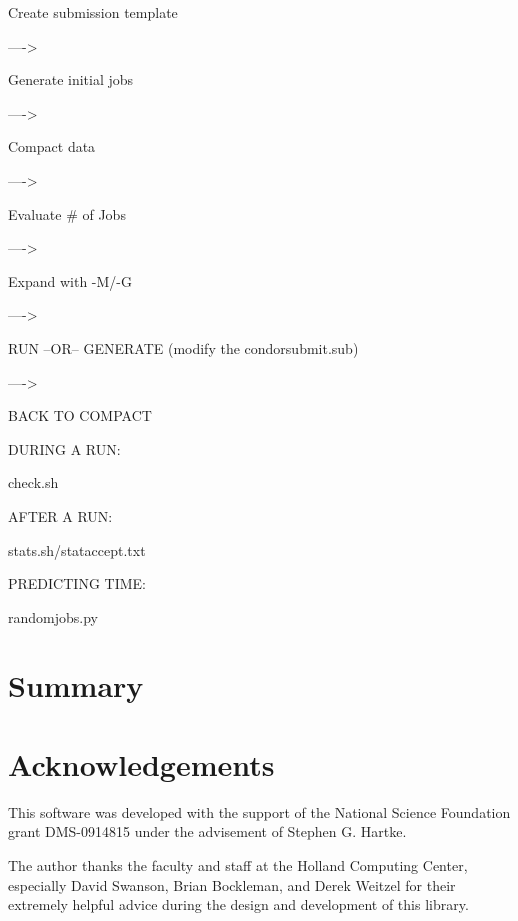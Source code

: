 \documentclass[11pt]{article}
\begin{document}
Create submission template

---->

Generate initial jobs

---->

Compact data

---->

Evaluate \# of Jobs

---->

Expand with -M/-G

---->

RUN  --OR-- GENERATE (modify the condorsubmit.sub)

---->

BACK TO COMPACT

DURING A RUN:

check.sh

AFTER A RUN:

stats.sh/stataccept.txt


PREDICTING TIME:

randomjobs.py


\section{Summary}
\label{sec:Summary}


\section{Acknowledgements}

This software was developed with the support of the National Science Foundation grant DMS-0914815
	under the advisement of Stephen G. Hartke.

The author thanks the faculty and staff
	at the Holland Computing Center,
	especially David Swanson, Brian Bockleman, and Derek Weitzel for their extremely helpful advice
	during the design and development of this library.






\end{document}
